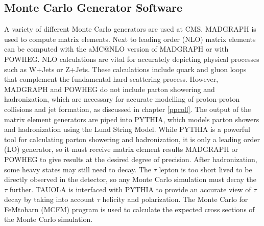 \documentclass[oneside, letterpaper, oldfontcommands]{memoir}
\begin{document}

\subsection{Monte Carlo Generator Software}\label{mcsoftware}

\qquad A variety of different Monte Carlo generators are used at CMS. MADGRAPH \cite{Alwall:2014hca} is used to compute matrix elements. Next to leading order (NLO) matrix elements can be computed with the aMC@NLO\cite{Alwall:2014hca} version of MADGRAPH or with POWHEG\cite{Alioli:2010xd, Frixione:2007vw, Nason:2004rx}. NLO calculations are vital for accurately depicting physical processes such as W+Jets or Z+Jets. These calculations include quark and gluon loops that complement the fundamental hard scattering process. However, MADGRAPH and POWHEG do not include parton showering and hadronization, which are necessary for accurate modelling of proton-proton collisions and jet formation, as discussed in chapter \ref{ppcoll}. The output of the matrix element generators are piped into PYTHIA, which models parton showers and hadronization using the Lund String Model. While PYTHIA is a powerful tool for calculating parton showering and hadronization, it is only a leading order (LO) generator, so it must receive matrix element results MADGRAPH or POWHEG to give results at the desired degree of precision. After hadronization, some heavy states may still need to decay. The $\tau$ lepton is too short lived to be directly observed in the detector, so any Monte Carlo simulation must decay the $\tau$ further. 
TAUOLA \cite{Was:2011tv} is interfaced with PYTHIA to provide an accurate view of $\tau$ decay by taking into account $\tau$ helicity and polarization. The Monte Carlo for FeMtobarn (MCFM) program \cite{Campbell:1999ah}\cite{Campbell:2011bn}\cite{Campbell:2015qma} is used to calculate the expected cross sections of the Monte Carlo simulation. 
\end{document}
